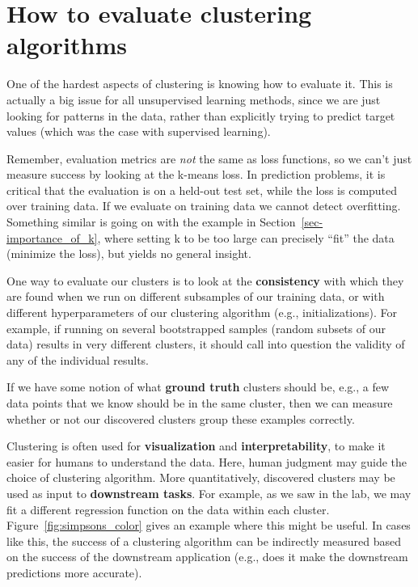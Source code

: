\section{How to evaluate clustering algorithms}
\label{sec-eval}

One of the hardest aspects of clustering is knowing how to evaluate
it. This is actually a big issue for all unsupervised learning
methods, since we are just looking for patterns in the data, rather
than explicitly trying to predict target values (which was the case
with supervised learning).

Remember, evaluation metrics are \textit{not} the same as loss
functions, so we can't just measure success by looking at the k-means
loss. In prediction problems, it is critical that the evaluation is on
a held-out test set, while the loss is computed over training data. If
we evaluate on training data we cannot detect overfitting. Something
similar is going on with the example in
Section~\ref{sec-importance_of_k}, where setting k to be too large can
precisely ``fit'' the data (minimize the loss), but yields no general
insight.

One way to evaluate our clusters is to look at the
\textbf{consistency} with which they are found when we run on
different subsamples of our training data, or with different
hyperparameters of our clustering algorithm (e.g.,
initializations). For example, if running on several bootstrapped
samples (random subsets of our data) results in very different
clusters, it should call into question the validity of any of the
individual results.

If we have some notion of what \textbf{ground truth} clusters should
be, e.g., a few data points that we know should be in the same
cluster, then we can measure whether or not our discovered clusters
group these examples correctly. 

Clustering is often used for \textbf{visualization} and
\textbf{interpretability}, to make it easier for humans to understand
the data. Here, human judgment may guide the choice of clustering
algorithm. More quantitatively, discovered clusters may be used as input to
\textbf{downstream tasks}. For example, as we saw in the lab, we may fit a different
regression function on the data within each
cluster. Figure~\ref{fig:simpsons_color} gives
an example where this might be useful. In cases like this, the success
of a clustering algorithm can be indirectly measured based on the
success of the downstream application (e.g., does it make the
downstream predictions more accurate).

